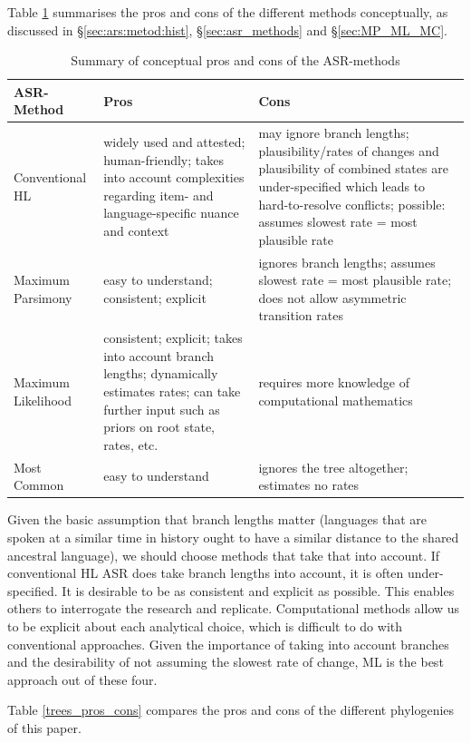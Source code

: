 \documentclass[12pt,letterpaper]{article}
\begin{document}
Table \ref{methods_pros_cpns} summarises the pros and cons of the different methods conceptually, as discussed in §\ref{sec:ars:metod:hist}, §\ref{sec:asr_methods} and §\ref{sec:MP_ML_MC}.

\begin{table}[ht]
\centering
\caption{Summary of conceptual pros and cons of the ASR-methods}
\label{methods_pros_cpns}
\begin{tabular}{m{4cm}m{5cm}m{5cm}}
  \toprule
\textbf{ASR-Method} & \textbf{Pros} & \textbf{Cons} \\ \midrule
Conventional HL &  widely used and attested; human-friendly; takes into account complexities regarding item- and language-specific nuance and context &  may ignore branch lengths; plausibility/rates of changes and plausibility of combined states are under-specified which leads to hard-to-resolve conflicts; possible: assumes slowest rate = most plausible rate\\ \midrule
Maximum Parsimony &  easy to understand; consistent; explicit  & ignores branch lengths; assumes slowest rate = most plausible rate; does not allow asymmetric transition rates\\ \midrule
Maximum Likelihood & consistent; explicit; takes into account branch lengths; dynamically estimates rates; can take further input such as priors on root state, rates, etc. & requires more knowledge of computational mathematics \\ \midrule
Most Common & easy to understand & ignores the tree altogether; estimates no rates  \\
\bottomrule
\end{tabular}
\end{table}

Given the basic assumption that branch lengths matter (languages that are spoken at a similar time in history ought to have a similar distance to the shared ancestral language), we should choose methods that take that into account. If conventional HL ASR does take branch lengths into account, it is often under-specified. It is desirable to be as consistent and explicit as possible. This enables others to interrogate the research and replicate. Computational methods allow us to be explicit about each analytical choice, which is difficult to do with conventional approaches. Given the importance of taking into account branches and the desirability of not assuming the slowest rate of change, ML is the best approach out of these four.

Table \ref{trees_pros_cons} compares the pros and cons of the different phylogenies of this paper.
\end{document}
